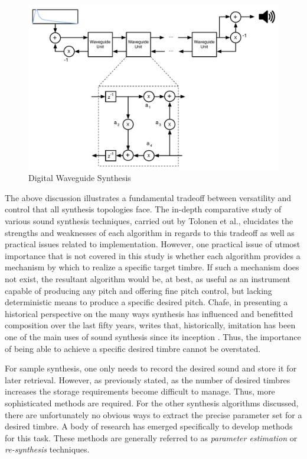 \documentclass[a4paper,12pt]{report} 	%
\numberwithin{figure}{chapter}
\numberwithin{table}{chapter}
\numberwithin{equation}{chapter}
\begin{document}
\begin{flushleft}
\\
\begin{figure}[h!]
\begin{center}
\includegraphics[scale=0.55]{DigitalWaveguideSynthesis}
\caption[Digital Waveguide Synthesis]{Digital Waveguide Synthesis}
\end{center}
\end{figure}
The above discussion illustrates a fundamental tradeoff between versatility and control that all synthesis topologies face. The in-depth comparative study of various sound synthesis techniques, carried out by Tolonen et al., elucidates the strengths and weaknesses of each algorithm in regards to this tradeoff as well as practical issues related to implementation. However, one practical issue of utmost importance that is not covered in this study is whether each algorithm provides a mechanism by which to realize a specific target timbre. If such a mechanism does not exist, the resultant algorithm would be, at best, as useful as an instrument capable of producing any pitch and offering fine pitch control, but lacking deterministic means to produce a specific desired pitch. Chafe, in presenting a historical perspective on the many ways synthesis has influenced and benefitted composition over the last fifty years, writes that, historically, imitation has been one of the main uses of sound synthesis since its inception \cite[p. 2]{Chafe:1999bx}. Thus, the importance of being able to achieve a specific desired timbre cannot be overstated.

For sample synthesis, one only needs to record the desired sound and store it for later retrieval. However, as previously stated, as the number of desired timbres increases the storage requirements become difficult to manage. Thus, more sophisticated methods are required. For the other synthesis algorithms discussed, there are unfortunately no obvious ways to extract the precise parameter set for a desired timbre. A body of research has emerged specifically to develop methods for this task. These methods are generally referred to as \emph{parameter estimation} or \emph{re-synthesis} techniques.


\end{flushleft}
\end{document}
